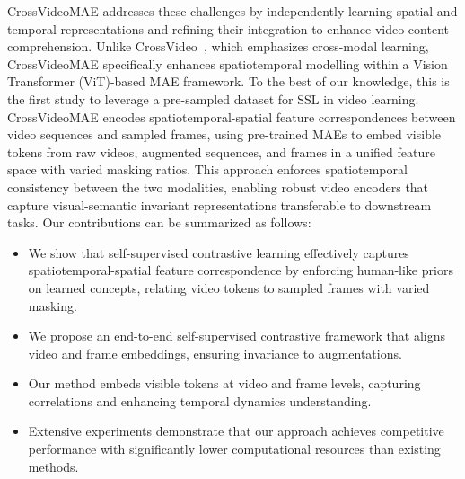 CrossVideoMAE addresses these challenges by independently learning spatial and temporal representations and refining their integration to enhance video content comprehension. Unlike CrossVideo~\cite{liu2024crossvideo}, which emphasizes cross-modal learning, CrossVideoMAE specifically enhances spatiotemporal modelling within a Vision Transformer (ViT)-based MAE framework. To the best of our knowledge, this is the first study to leverage a pre-sampled dataset for SSL in video learning. CrossVideoMAE encodes spatiotemporal-spatial feature correspondences between video sequences and sampled frames, using pre-trained MAEs to embed visible tokens from raw videos, augmented sequences, and frames in a unified feature space with varied masking ratios. This approach enforces spatiotemporal consistency between the two modalities, enabling robust video encoders that capture visual-semantic invariant representations transferable to downstream tasks. Our contributions can be summarized as follows:

\begin{itemize}
\item We show that self-supervised contrastive learning effectively captures spatiotemporal-spatial feature correspondence by enforcing human-like priors on learned concepts, relating video tokens to sampled frames with varied masking.

\item We propose an end-to-end self-supervised contrastive framework that aligns video and frame embeddings, ensuring invariance to augmentations.

\item Our method embeds visible tokens at video and frame levels, capturing correlations and enhancing temporal dynamics understanding.

\item Extensive experiments demonstrate that our approach achieves competitive performance with significantly lower computational resources than existing methods.

\end{itemize}
